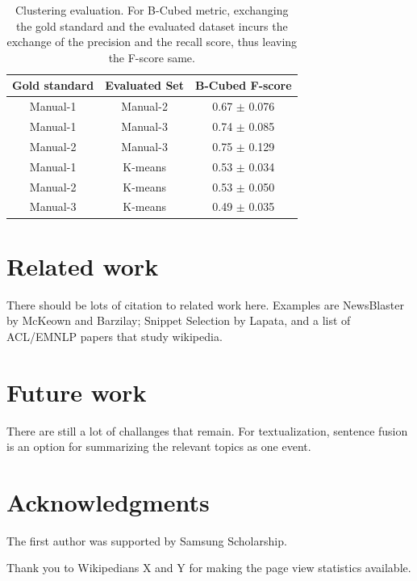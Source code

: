 \documentclass[11pt]{article}
\begin{document}
\begin{table}
\centering
\begin{tabular}{|c|c|c|}
\hline
Gold standard & Evaluated Set & B-Cubed F-score \\
\hline
Manual-1 & Manual-2 & 0.67 $\pm$ {\small 0.076} \\
Manual-1 & Manual-3 & 0.74 $\pm$ {\small 0.085} \\
Manual-2 & Manual-3 & 0.75 $\pm$ {\small 0.129} \\
\hline
Manual-1 & K-means & 0.53 $\pm$ {\small 0.034} \\
Manual-2 & K-means & 0.53 $\pm$ {\small 0.050} \\
Manual-3 & K-means & 0.49 $\pm$ {\small 0.035} \\
\hline
\end{tabular}
\caption{Clustering evaluation. For B-Cubed metric, exchanging the gold standard and the evaluated dataset incurs the exchange of the precision and the recall score, thus leaving the F-score same.}
\label{tab:clustering}
\end{table}

\section{Related work}
\label{sec:related-work}

There should be lots of citation to related work here. Examples are NewsBlaster by McKeown and Barzilay; Snippet Selection by Lapata, and a list of ACL/EMNLP papers that study wikipedia.

\section{Future work}

There are still a lot of challanges that remain. For textualization, sentence fusion is an option for summarizing the relevant topics as one event.

\section*{Acknowledgments}

The first author was supported by Samsung Scholarship.

Thank you to Wikipedians X and Y for making the page view statistics available.
\end{document}
